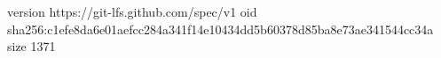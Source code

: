 version https://git-lfs.github.com/spec/v1
oid sha256:c1efe8da6e01aefcc284a341f14e10434dd5b60378d85ba8e73ae341544cc34a
size 1371
